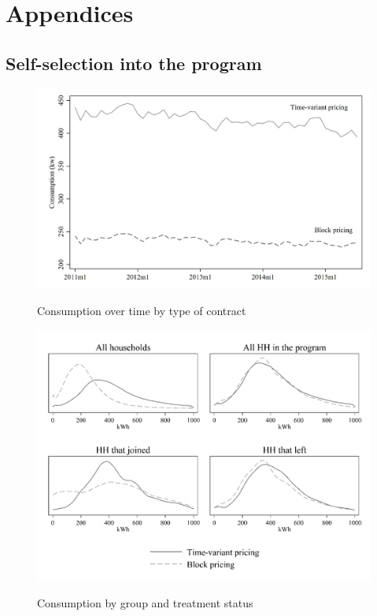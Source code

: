 
\section{Appendices}

\subsection{Self-selection into the program}\label{appendix:A}

\begin{figure}[ht]
  \caption{Consumption over time by type of contract}\label{fig:six}
  \begin{center}
  {\includegraphics[width=1\textwidth]{./figures/image6.png}}
  \end{center}
\end{figure}

\FloatBarrier

\begin{figure}[ht]
  \caption{Consumption by group and treatment status}\label{fig:seven}
  \begin{center}
  {\includegraphics[width=1\textwidth]{./figures/image7.png}}
  \end{center}
\end{figure}

